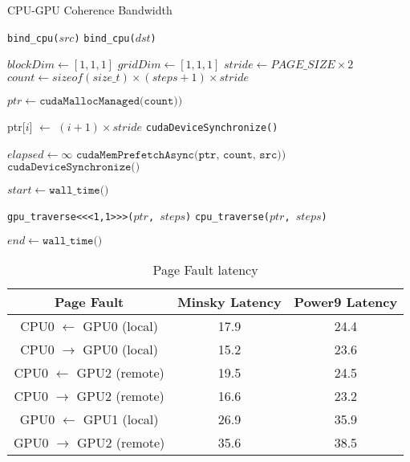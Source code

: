 \begin{algorithm}
	\caption{CPU-GPU Coherence Bandwidth}
	\label{alg:um-latency}
	\begin{algorithmic}[1]
		\Statex
				
            \State \texttt{bind\_cpu($src$)}
        \EndIf
            \State \texttt{bind\_cpu($dst$)}
        \EndIf

        \State $blockDim \gets [1,1,1]$ 
        \State $gridDim \gets [1,1,1]$
        \State $stride \gets PAGE\_SIZE \times 2$
        \State $count \gets sizeof(size\_t) \times (steps + 1) \times stride$

        \State $ptr \gets \texttt{cudaMallocManaged(count))}$

            \State ptr[$i$] $\gets$ $(i+1)\times stride$
        \EndFor
        \State \texttt{cudaDeviceSynchronize()}

        \State $elapsed \gets \infty$
            \State $\texttt{cudaMemPrefetchAsync(ptr, count, src))}$
            \State $\texttt{cudaDeviceSynchronize()}$

            \State $start \gets \texttt{wall\_time()}$

                \State \texttt{gpu\_traverse<<<1,1>>>($ptr$, $steps$)}
            \Else
                \State \texttt{cpu\_traverse($ptr$, $steps$)}
            \EndIf

            \State $end \gets \texttt{wall\_time()}$
        \EndFor

		\EndFunction
				
	\end{algorithmic}
\end{algorithm}


\begin{table}[h]
	\centering
	\caption[]{Page Fault latency}
	\label{tab:page-fault-latency}
	\begin{tabular}{|c|c|c|}
		\hline
		\textbf{Page Fault}              & \textbf{Minsky Latency} & \textbf{Power9 Latency} \\ \hline
		CPU0 $\leftarrow$ GPU0  (local)  & 17.9                    & 24.4                    \\ \hline
		CPU0 $\rightarrow$ GPU0 (local)  & 15.2                    & 23.6                    \\ \hline
		CPU0 $\leftarrow$ GPU2  (remote) & 19.5                    & 24.5                    \\ \hline
		CPU0 $\rightarrow$ GPU2 (remote) & 16.6                    & 23.2                    \\ \hline
		GPU0 $\leftarrow$ GPU1  (local)  & 26.9                    & 35.9                    \\ \hline
		GPU0 $\rightarrow$ GPU2 (remote) & 35.6                    & 38.5                    \\ \hline
	\end{tabular}
\end{table}


